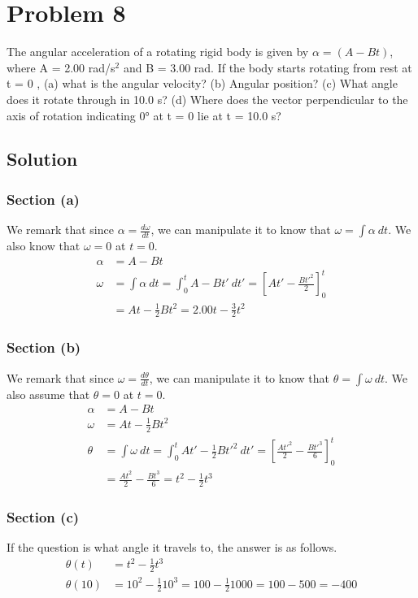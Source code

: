\documentclass[12pt]{article}
\begin{document}
\pagebreak
\section*{Problem 8}
The angular acceleration of a rotating rigid body is given by $\alpha = (A - Bt)$, where A = 2.00 rad/s$^2$ and B = 3.00 rad. If the body starts rotating from rest at t = 0 , (a) what is the angular velocity? (b) Angular position? (c) What angle does it rotate through in 10.0 s? (d) Where does the vector perpendicular to the axis of rotation indicating 0\unit{\degree} at t = 0 lie at t = 10.0 s?

\subsection*{Solution}
\subsubsection*{Section (a)}
We remark that since $\alpha = \frac{d\omega}{dt}$, we can manipulate it to know that $\omega = \int \alpha\ dt$. We also know that $\omega = 0$ at $t = 0$.
\begin{align*}
    \alpha  &=  A - Bt\\
    \omega  &=  \int \alpha\ dt
            =   \int_{0}^{t} A - Bt'\ dt'
            =   \left[At' - \frac{Bt'^2}{2}\right]_0^t\\
            &=  At - \frac{1}{2}Bt^2
            =   \boxed{2.00t - \frac{3}{2}t^2}
\end{align*}

\subsubsection*{Section (b)}
We remark that since $\omega = \frac{d\theta}{dt}$, we can manipulate it to know that $\theta = \int \omega\ dt$. We also assume that $\theta = 0$ at $t = 0$.
\begin{align*}
    \alpha  &=  A - Bt\\
    \omega  &=  At - \frac{1}{2}Bt^2\\
    \theta  &=  \int \omega\ dt
            =   \int_{0}^{t} At' - \frac{1}{2}Bt'^2\ dt'
            =   \left[\frac{At'^2}{2} - \frac{Bt'^3}{6}\right]_0^t\\
            &=  \frac{At^2}{2} - \frac{Bt^3}{6}
            =   \boxed{t^2 - \frac{1}{2}t^3}
\end{align*}

\pagebreak
\subsubsection*{Section (c)}
If the question is what angle it travels to, the answer is as follows.
\begin{align*}
    \theta(t)   &=  t^2 - \frac{1}{2}t^3\\
    \theta(10)  &=  10^2 - \frac{1}{2}10^3
        =   100 - \frac{1}{2}1000
        =   100 - 500
        =   \boxed{-400}
\end{align*}
\end{document}
